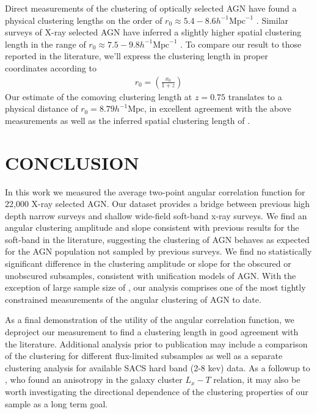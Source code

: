 \documentclass[preprint]{aastex63}
\begin{document}
Direct measurements of the clustering of optically selected AGN have found a physical clustering lengths on the order of $r_0 \approx 5.4 - 8.6 h^{-1} \text{Mpc}^{-1}$ \citep{akylas:2000,croom:2002,grazian:2004}. 
Similar surveys of X-ray selected AGN have inferred a slightly higher spatial clustering length in the range of $r_0 \approx 7.5 - 9.8 h^{-1} \text{Mpc}^{-1}$ \citep{basilakos:2008,miyaji,plionis:2018}. To compare our result to 
those reported in the literature, we'll express the clustering length in proper coordinates according to 
\begin{align}
    \label{eq:prop_coord}
    r_0 = \left(\frac{x_0}{1+z}\right)
\end{align}
Our estimate of the comoving clustering length at $z = 0.75$ translates to a physical distance of $r_0 = 8.79 h^{-1} \text{Mpc}$, in excellent agreement with the above measurements 
as well as the inferred spatial clustering length of \citet{ebrero}.
\section{CONCLUSION}

In this work we measured the average two-point angular correlation function
for 22,000 X-ray selected AGN. Our dataset provides a bridge 
between previous high depth narrow surveys and
shallow wide-field soft-band x-ray surveys. We find an angular clustering 
amplitude and slope consistent with previous results for the soft-band in the literature, 
suggesting the clustering of AGN behaves as expected for the AGN population not sampled by previous surveys.
We find no statistically significant difference in the clustering amplitude or 
slope for the obscured or unobscured subsamples, consistent with unification models of AGN. With the exception of large sample size of \citet{ebrero}, our analysis comprises one of the most tightly constrained measurements
of the angular clustering of AGN to date.

As a final demonstration of the utility of the angular correlation function, we deproject our measurement to find a clustering length in good agreement with the literature.
Additional analysis prior to publication may include a comparison of the clustering 
for different flux-limited subsamples as well as a separate clustering analysis for available SACS hard band (2-8 kev) data. As a followup to 
\citet{migkas}, who found an anisotropy in the galaxy cluster $L_x - T$ relation, it may also be worth investigating the directional dependence of 
the clustering properties of our sample as a long term goal.
\end{document}
